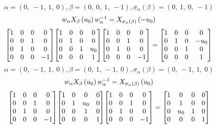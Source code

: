 \documentclass[11pt]{article}
\theoremstyle{definition}
\begin{document}
\[
\alpha = \left( 0, \  -1, \  1, \  0\right), \beta = \left( 0, \  0, \  1, \  -1\right), \sigma_{\alpha}(\beta) = \left( 0, \  1, \  0, \  -1\right)
\]
\[
\scaletoalign{\textwidth}{w_{\alpha} X_{\beta}\left(u_{0}\right) w_{\alpha}^{-1} = X_{\sigma_{\alpha}\left(\beta\right)}\left(- u_{0}\right)}
\]
\[
\scaletoalign{\textwidth}{{\left[\begin{matrix}1 & 0 & 0 & 0\\0 & 0 & 1 & 0\\0 & 1 & 0 & 0\\0 & 0 & 0 & -1\end{matrix}\right]} {\left[\begin{matrix}1 & 0 & 0 & 0\\0 & 1 & 0 & 0\\0 & 0 & 1 & u_{0}\\0 & 0 & 0 & 1\end{matrix}\right]} {\left[\begin{matrix}1 & 0 & 0 & 0\\0 & 0 & 1 & 0\\0 & 1 & 0 & 0\\0 & 0 & 0 & -1\end{matrix}\right]} = {\left[\begin{matrix}1 & 0 & 0 & 0\\0 & 1 & 0 & - u_{0}\\0 & 0 & 1 & 0\\0 & 0 & 0 & 1\end{matrix}\right]}}
\]
\[
\alpha = \left( 0, \  -1, \  1, \  0\right), \beta = \left( 0, \  1, \  -1, \  0\right), \sigma_{\alpha}(\beta) = \left( 0, \  -1, \  1, \  0\right)
\]
\[
\scaletoalign{\textwidth}{w_{\alpha} X_{\beta}\left(u_{0}\right) w_{\alpha}^{-1} = X_{\sigma_{\alpha}\left(\beta\right)}\left(u_{0}\right)}
\]
\[
\scaletoalign{\textwidth}{{\left[\begin{matrix}1 & 0 & 0 & 0\\0 & 0 & 1 & 0\\0 & 1 & 0 & 0\\0 & 0 & 0 & -1\end{matrix}\right]} {\left[\begin{matrix}1 & 0 & 0 & 0\\0 & 1 & u_{0} & 0\\0 & 0 & 1 & 0\\0 & 0 & 0 & 1\end{matrix}\right]} {\left[\begin{matrix}1 & 0 & 0 & 0\\0 & 0 & 1 & 0\\0 & 1 & 0 & 0\\0 & 0 & 0 & -1\end{matrix}\right]} = {\left[\begin{matrix}1 & 0 & 0 & 0\\0 & 1 & 0 & 0\\0 & u_{0} & 1 & 0\\0 & 0 & 0 & 1\end{matrix}\right]}}
\]
\end{document}

